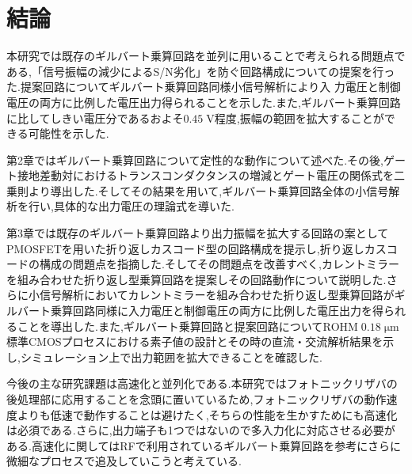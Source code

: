 \chapter{結論}

    本研究では既存のギルバート乗算回路を並列に用いることで考えられる問題点である,「信号振幅の減少によるS/N劣化」を防ぐ回路構成についての提案を行った.提案回路についてギルバート乗算回路同様小信号解析により入
    力電圧と制御電圧の両方に比例した電圧出力得られることを示した.また,ギルバート乗算回路に比してしきい電圧分であるおよそ$0.45\;\mathrm{V}$程度,振幅の範囲を拡大することができる可能性を示した.\par

    第2章ではギルバート乗算回路について定性的な動作について述べた.その後,ゲート接地差動対におけるトランスコンダクタンスの増減とゲート電圧の関係式を二乗則より導出した.そしてその結果を用いて,ギルバート乗算回路全体の小信号解析を行い,具体的な出力電圧の理論式を導いた.\par

    第3章では既存のギルバート乗算回路より出力振幅を拡大する回路の案としてPMOSFETを用いた折り返しカスコード型の回路構成を提示し,折り返しカスコードの構成の問題点を指摘した.そしてその問題点を改善すべく,カレントミラーを組み合わせた折り返し型乗算回路を提案しその回路動作について説明した.さらに小信号解析においてカレントミラーを組み合わせた折り返し型乗算回路がギルバート乗算回路同様に入力電圧と制御電圧の両方に比例した電圧出力を得られることを導出した.また,ギルバート乗算回路と提案回路について$\mathrm{ROHM\;0.18\;\mu m}$標準CMOSプロセスにおける素子値の設計とその時の直流・交流解析結果を示し,シミュレーション上で出力範囲を拡大できることを確認した.\par

    今後の主な研究課題は高速化と並列化である.本研究ではフォトニックリザバの後処理部に応用することを念頭に置いているため,フォトニックリザバの動作速度よりも低速で動作することは避けたく,そちらの性能を生かすためにも高速化は必須である.さらに,出力端子も1つではないので多入力化に対応させる必要がある.高速化に関してはRFで利用されているギルバート乗算回路を参考にさらに微細なプロセスで追及していこうと考えている.